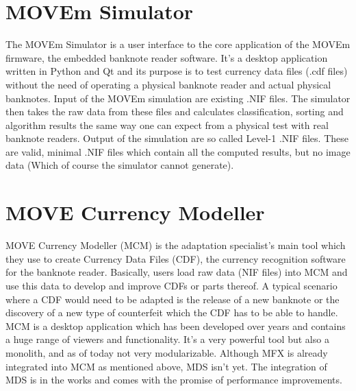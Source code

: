 \section{MOVEm Simulator}
The MOVEm Simulator is a user interface to the core application of the MOVEm firmware, the embedded banknote reader software. It's a desktop application written in Python and Qt and its purpose is to test currency data files (.cdf files) without the need of operating a physical banknote reader and actual physical banknotes. Input of the MOVEm simulation are existing .NIF files. The simulator then takes the raw data from these files and calculates classification, sorting and algorithm results the same way one can expect from a physical test with real banknote readers. Output of the simulation are so called Level-1 .NIF files. These are valid, minimal .NIF files which contain all the computed results, but no image data (Which of course the simulator cannot generate). 

\section{MOVE Currency Modeller}
MOVE Currency Modeller (MCM) is the adaptation specialist's main tool which they use to create Currency Data Files (CDF), the currency recognition software for the banknote reader. Basically, users load raw data (NIF files) into MCM and use this data to develop and improve CDFs or parts thereof. A typical scenario where a CDF would need to be adapted is the release of a new banknote or the discovery of a new type of counterfeit which the CDF has to be able to handle. MCM is a desktop application which has been developed over years and contains a huge range of viewers and functionality. It's a very powerful tool but also a monolith, and as of today not very modularizable. Although MFX is already integrated into MCM as mentioned above, MDS isn't yet. The integration of MDS is in the works and comes with the promise of performance improvements.